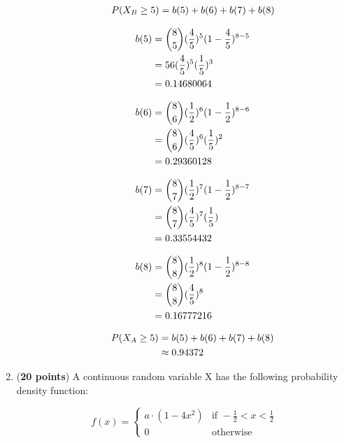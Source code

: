 \documentclass[a4paper]{article}
\begin{document}
\begin{enumerate}
\begin{enumerate}
\begin{align}
	P(X_B \geq 5) = b(5) + b(6) + b(7) + b(8) \notag
\end{align}	
	
\begin{align}
	b(5) &= {8 \choose 5}(\frac{4}{5})^5(1 - \frac{4}{5})^{8 - 5}\notag\\
	&= 56 (\frac{4}{5})^5(\frac{1}{5})^3\notag\\
	&= 0.14680064\notag
\end{align}

\begin{align}
	b(6) &= {8 \choose 6}(\frac{1}{2})^6(1 - \frac{1}{2})^{8 - 6}\notag\\
	&= {8 \choose 6}(\frac{4}{5})^6(\frac{1}{5})^2\notag\\
	&= 0.29360128\notag
\end{align}
	
	
\begin{align}
	b(7) &= {8 \choose 7}(\frac{1}{2})^7(1 - \frac{1}{2})^{8 - 7}\notag\\
	&= {8 \choose 7}(\frac{4}{5})^7(\frac{1}{5})\notag\\
	&= 0.33554432\notag
\end{align}


\begin{align}
	b(8) &= {8 \choose 8}(\frac{1}{2})^8(1 - \frac{1}{2})^{8 - 8}\notag\\
	&= {8 \choose 8}(\frac{4}{5})^8\notag\\
	&= 0.16777216\notag
\end{align}

\begin{align}
	P(X_A \geq 5) &= b(5) + b(6) + b(7) + b(8) \notag\\
	&\approx 0.94372\notag
\end{align}	
	
\end{enumerate}


\item (\textbf{20 points}) A continuous random variable X has the following probability density function:


\[
 f(x) = 
  \begin{cases} 
   a \cdot (1 - 4x^2) & \text{if } -\frac{1}{2} < x < \frac{1}{2}\\
   0 & \text{otherwise}
  \end{cases}
\]





\end{enumerate}
\end{document}

